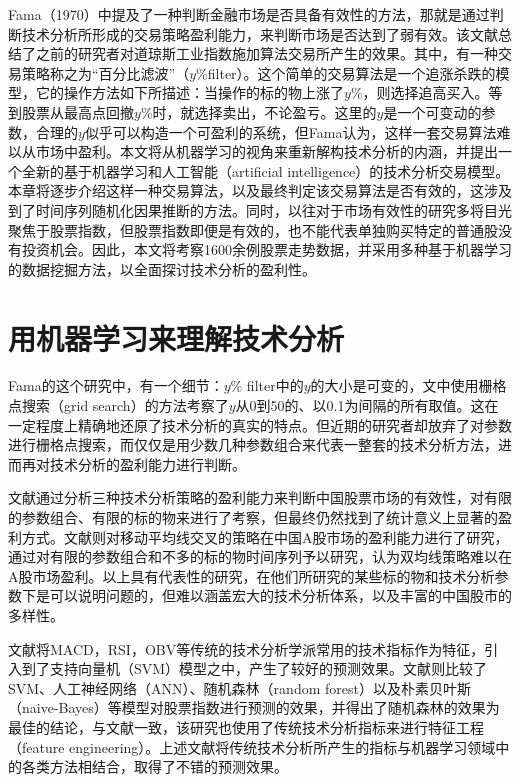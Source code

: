 \documentclass[twoside,longtitle]{LZUthesis}
\begin{document}
Fama（1970）\cite{Malkiel1970EFFICIENT}中提及了一种判断金融市场是否具备有效性的方法，那就是通过判断技术分析所形成的交易策略盈利能力，来判断市场是否达到了弱有效。该文献总结了之前的研究者对道琼斯工业指数施加算法交易所产生的效果。其中，有一种交易策略称之为“百分比滤波”（$y\%$filter）。这个简单的交易算法是一个追涨杀跌的模型，它的操作方法如下所描述：当操作的标的物上涨了$y\%$，则选择追高买入。等到股票从最高点回撤$y\%$时，就选择卖出，不论盈亏。这里的$y$是一个可变动的参数，合理的$y$似乎可以构造一个可盈利的系统，但Fama认为，这样一套交易算法难以从市场中盈利。本文将从机器学习的视角来重新解构技术分析的内涵，并提出一个全新的基于机器学习和人工智能（artificial intelligence）的技术分析交易模型。本章将逐步介绍这样一种交易算法，以及最终判定该交易算法是否有效的，这涉及到了时间序列随机化因果推断的方法。同时，以往对于市场有效性的研究多将目光聚焦于股票指数，但股票指数即便是有效的，也不能代表单独购买特定的普通股没有投资机会。因此，本文将考察1600余例股票走势数据，并采用多种基于机器学习的数据挖掘方法，以全面探讨技术分析的盈利性。
 
\section{用机器学习来理解技术分析}
Fama的这个研究中，有一个细节：$y\%$ filter中的$y$的大小是可变的，文中使用栅格点搜索（grid search）的方法考察了$y$从0到50的、以0.1为间隔的所有取值。这在一定程度上精确地还原了技术分析的真实的特点。但近期的研究者却放弃了对参数进行栅格点搜索，而仅仅是用少数几种参数组合来代表一整套的技术分析方法，进而再对技术分析的盈利能力进行判断。

文献\cite{sunbibo2004}通过分析三种技术分析策略的盈利能力来判断中国股票市场的有效性，对有限的参数组合、有限的标的物来进行了考察，但最终仍然找到了统计意义上显著的盈利方式。文献\cite{linlijia2019}则对移动平均线交叉的策略在中国A股市场的盈利能力进行了研究，通过对有限的参数组合和不多的标的物时间序列予以研究，认为双均线策略难以在A股市场盈利。以上具有代表性的研究，在他们所研究的某些标的物和技术分析参数下是可以说明问题的，但难以涵盖宏大的技术分析体系，以及丰富的中国股市的多样性。

文献\cite{chenfangfang2019}将MACD，RSI，OBV等传统的技术分析学派常用的技术指标作为特征，引入到了支持向量机（SVM）模型之中，产生了较好的预测效果。文献\cite{Patel2015Predicting}则比较了SVM、人工神经网络（ANN）、随机森林（random  forest）以及朴素贝叶斯（naive-Bayes）等模型对股票指数进行预测的效果，并得出了随机森林的效果为最佳的结论，与文献\cite{chenfangfang2019}一致，该研究也使用了传统技术分析指标来进行特征工程（feature engineering）。上述文献将传统技术分析所产生的指标与机器学习领域中的各类方法相结合，取得了不错的预测效果。
\end{document}

